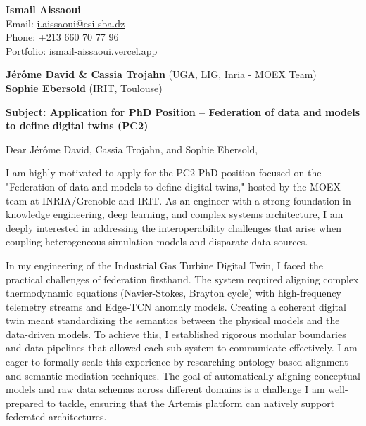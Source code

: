 \documentclass[11pt,a4paper]{article}
\begin{document}
\thispagestyle{empty}

\begin{flushright}
\textbf{Ismail Aissaoui} \\
Email: \href{mailto:i.aissaoui@esi-sba.dz}{i.aissaoui@esi-sba.dz} \\
Phone: +213 660 70 77 96 \\
Portfolio: \href{https://ismail-aissaoui.vercel.app}{ismail-aissaoui.vercel.app}
\end{flushright}

\vspace{1em}

\begin{flushleft}
\textbf{Jérôme David \& Cassia Trojahn} (UGA, LIG, Inria - MOEX Team) \\
\textbf{Sophie Ebersold} (IRIT, Toulouse)
\end{flushleft}

\vspace{1em}
\noindent\textbf{Subject: Application for PhD Position -- Federation of data and models to define digital twins (PC2)}
\vspace{1em}

\noindent Dear Jérôme David, Cassia Trojahn, and Sophie Ebersold,

\vspace{1em}
\noindent
I am highly motivated to apply for the PC2 PhD position focused on the "Federation of data and models to define digital twins," hosted by the MOEX team at INRIA/Grenoble and IRIT. As an engineer with a strong foundation in knowledge engineering, deep learning, and complex systems architecture, I am deeply interested in addressing the interoperability challenges that arise when coupling heterogeneous simulation models and disparate data sources.

\vspace{0.5em}
\noindent
In my engineering of the Industrial Gas Turbine Digital Twin, I faced the practical challenges of federation firsthand. The system required aligning complex thermodynamic equations (Navier-Stokes, Brayton cycle) with high-frequency telemetry streams and Edge-TCN anomaly models. Creating a coherent digital twin meant standardizing the semantics between the physical models and the data-driven models. To achieve this, I established rigorous modular boundaries and data pipelines that allowed each sub-system to communicate effectively. I am eager to formally scale this experience by researching ontology-based alignment and semantic mediation techniques. The goal of automatically aligning conceptual models and raw data schemas across different domains is a challenge I am well-prepared to tackle, ensuring that the Artemis platform can natively support federated architectures.
\end{document}
